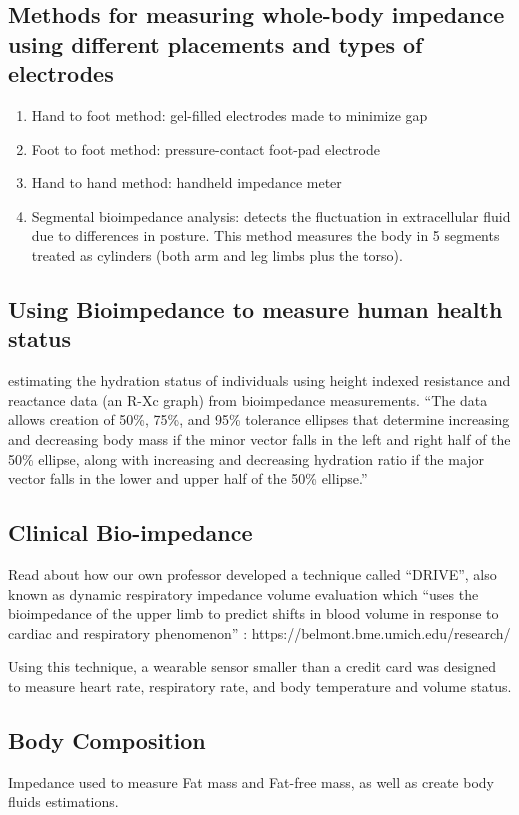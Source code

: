 \documentclass[11pt]{book}
\begin{document}
\subsection{Methods for measuring whole-body impedance using different placements and types of electrodes}
\begin{enumerate}
	\item Hand to foot method: gel-filled electrodes made to minimize gap 
	\item Foot to foot method: pressure-contact foot-pad electrode
	\item Hand to hand method: handheld impedance meter
	\item Segmental bioimpedance analysis: detects the fluctuation in extracellular fluid due to differences in posture. This method measures the body in 5 segments treated as cylinders (both arm and leg limbs plus the torso). 
\end{enumerate}

\subsection{Using Bioimpedance to measure human health status} estimating the hydration status of individuals using height indexed resistance and reactance data (an R-Xc graph) from bioimpedance measurements. “The data allows creation of 50\%, 75\%, and 95\% tolerance ellipses that determine increasing and decreasing body mass if the minor vector falls in the left and right half of the 50\% ellipse, along with increasing and decreasing hydration ratio if the major vector falls in the lower and upper half of the 50\% ellipse.”

\subsection{Clinical Bio-impedance} Read about how our own professor developed a technique called ``DRIVE'', also known as dynamic respiratory impedance volume evaluation which ``uses the bioimpedance of the upper limb to predict shifts in blood volume in response to cardiac and respiratory phenomenon'' : https://belmont.bme.umich.edu/research/ 

Using this technique, a wearable sensor smaller than a credit card was designed to measure heart rate, respiratory rate, and body temperature and volume status. 

\subsection{Body Composition} Impedance used to measure Fat mass and Fat-free mass, as well as create body fluids estimations. 
\end{document}
